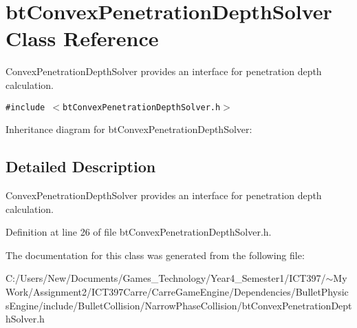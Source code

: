 \hypertarget{classbt_convex_penetration_depth_solver}{
\section{btConvexPenetrationDepthSolver Class Reference}
\label{classbt_convex_penetration_depth_solver}
}
ConvexPenetrationDepthSolver provides an interface for penetration depth calculation.  


{\tt \#include $<$btConvexPenetrationDepthSolver.h$>$}

Inheritance diagram for btConvexPenetrationDepthSolver:

\subsection{Detailed Description}
ConvexPenetrationDepthSolver provides an interface for penetration depth calculation. 

Definition at line 26 of file btConvexPenetrationDepthSolver.h.

The documentation for this class was generated from the following file:\begin{CompactItemize}
\item 
C:/Users/New/Documents/Games\_\-Technology/Year4\_\-Semester1/ICT397/$\sim$My Work/Assignment2/ICT397Carre/CarreGameEngine/Dependencies/BulletPhysicsEngine/include/BulletCollision/NarrowPhaseCollision/btConvexPenetrationDepthSolver.h\end{CompactItemize}
